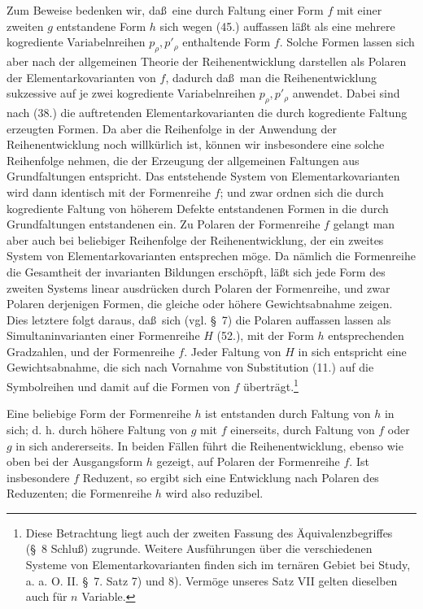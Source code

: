 \documentclass[11pt]{article}
\begin{document}
Zum Beweise bedenken wir, da\ss\ eine durch Faltung einer Form $f$ mit einer zweiten $g$ entstandene Form $h$ sich wegen (45.) auffassen l\"a\ss t als eine mehrere kogrediente Variabelnreihen $p_\rho,p'_\rho$ enthaltende Form $f$. Solche Formen lassen sich aber nach der allgemeinen Theorie der Reihenentwicklung darstellen als Polaren der Elementarkovarianten von $f$, dadurch da\ss\ man die Reihenentwicklung sukzessive auf je zwei kogrediente Variabelnreihen $p_\rho,p'_\rho$ anwendet. Dabei sind nach (38.) die auftretenden Elementarkovarianten die durch kogrediente Faltung erzeugten Formen. Da aber die Reihenfolge in der Anwendung der Reihenentwicklung noch willk\"urlich ist, k\"onnen wir insbesondere eine solche Reihenfolge nehmen, die der Erzeugung der allgemeinen Faltungen aus Grundfaltungen entspricht. Das entstehende System von Elementarkovarianten wird dann identisch mit der Formenreihe $f$; und zwar ordnen sich die durch kogrediente Faltung von h\"oherem Defekte entstandenen Formen in die durch Grundfaltungen entstandenen ein. Zu Polaren der Formenreihe $f$ gelangt man aber auch bei beliebiger Reihenfolge der Reihenentwicklung, der ein zweites System von Elementarkovarianten entsprechen m\"oge. Da n\"amlich die Formenreihe die Gesamtheit der invarianten Bildungen ersch\"opft, l\"a\ss t sich jede Form des zweiten Systems linear ausdr\"ucken durch Polaren der Formenreihe, und zwar Polaren derjenigen Formen, die gleiche oder h\"ohere Gewichtsabnahme zeigen. Dies letztere folgt daraus, da\ss\ sich (vgl. \S\ 7) die Polaren auffassen lassen als Simultaninvarianten einer Formenreihe $H$ (52.), mit der Form $h$ entsprechenden Gradzahlen, und der Formenreihe $f$. Jeder Faltung von $H$ in sich entspricht eine Gewichtsabnahme, die sich nach Vornahme von Substitution (11.) auf die Symbolreihen und damit auf die Formen von $f$ \"ubertr\"agt.\footnote{Diese Betrachtung liegt auch der zweiten Fassung des \"Aquivalenzbegriffes (\S\ 8 Schlu\ss) zugrunde. Weitere Ausf\"uhrungen \"uber die verschiedenen Systeme von Elementarkovarianten finden sich im tern\"aren Gebiet bei Study, a. a. O. II. \S\ 7. Satz 7) und 8). Verm\"oge unseres Satz VII gelten dieselben auch f\"ur $n$ Variable.}

Eine beliebige Form der Formenreihe $h$ ist entstanden durch Faltung von $h$ in sich; d. h. durch h\"ohere Faltung von $g$ mit $f$ einerseits, durch Faltung von $f$ oder $g$ in sich andererseits. In beiden F\"allen f\"uhrt die Reihenentwicklung, ebenso wie oben bei der Ausgangsform $h$ gezeigt, auf Polaren der Formenreihe $f$. Ist insbesondere $f$ Reduzent, so ergibt sich eine Entwicklung nach Polaren des Reduzenten; die Formenreihe $h$ wird also reduzibel.
\end{document}
